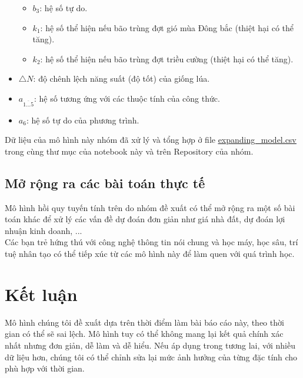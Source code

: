 \documentclass[12pt]{report}
\begin{document}
\begin{flushleft}
\begin{itemize}
\begin{itemize}
			\item $b_{3}$: hệ số tự do.

			\item $k_{1}$: hệ số thể hiện nếu bão trùng đợt gió mùa Đông bắc (thiệt hại có thể tăng).

			\item $k_{2}$: hệ số thể hiện nếu bão trùng đợt triều cường (thiệt hại có thể tăng).
		\end{itemize}

		\item $\triangle{N}$: độ chênh lệch năng suất (độ tốt) của giống lúa.

		\item $a^{}_{\overline{1 \dots 5}}$: hệ số tương ứng với các thuộc tính của công thức.

		\item $a_{6}$: hệ số tự do của phương trình.
	\end{itemize}

	Dữ liệu của mô hình này nhóm đã xử lý và tổng hợp ở file \textcolor{blue}{\underline{\href{https://github.com/XuananLe/MathModelingContest/blob/main/expanding_model.csv}{expanding\_model.csv}}} trong cùng thư mục của notebook này và trên Repository của nhóm.
\end{flushleft}

\subsection{Mở rộng ra các bài toán thực tế}
\begin{flushleft}
	Mô hình hồi quy tuyến tính trên do nhóm đề xuất có thể mở rộng ra một số bài toán khác để xử lý các vấn đề dự đoán đơn giản như giá nhà đất, dự đoán lợi nhuận kinh doanh, ...
	\\[\baselineskip]

	Các bạn trẻ hứng thú với công nghệ thông tin nói chung và học máy, học sâu, trí tuệ nhân tạo có thể tiếp xúc từ các mô hình này để làm quen với quá trình học.
\end{flushleft}

\section{Kết luận} %
\label{sec:kết_luận}
\begin{flushleft}
	Mô hình chúng tôi đề xuất dựa trên thời điểm làm bài báo cáo này, theo thời gian có thể sẽ sai lệch. Mô hình tuy có thể không mang lại kết quả chính xác nhất nhưng đơn giản, dễ làm và dễ hiểu. Nếu áp dụng trong tương lai, với nhiều dữ liệu hơn, chúng tôi có thể chỉnh sửa lại mức ảnh hưởng của từng đặc tính cho phù hợp với thời gian.
\end{flushleft}
\end{document}
